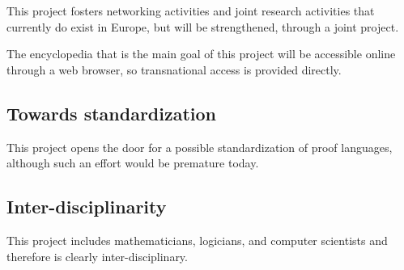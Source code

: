 This project fosters networking activities and joint research
activities that currently do exist in Europe, but will be
strengthened, through a joint project.

The encyclopedia that is the main goal of this project will be
accessible online through a web browser, so transnational access is
provided directly.

\subsection{Towards standardization}
This project opens the door for a possible standardization of proof
languages, although such an effort would be premature today.

\subsection{Inter-disciplinarity}
This project includes mathematicians, logicians, and computer
scientists and therefore is clearly inter-disciplinary.

 
